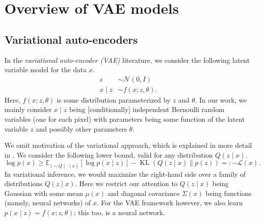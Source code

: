 \documentclass[10pt]{article}
\newcommand{\op}[1]{\operatorname{#1}}
\newcommand{\E}{\mathbb{E}}
\begin{document}




\section{Overview of VAE models}

\subsection{Variational auto-encoders}

In the \emph{variational auto-encoder (VAE)}  literature, we consider the following latent variable model for the data $x$.
\begin{align}
z &\sim \mathcal{N}(0,I)\\
x \mid z &\sim f(x ; z, \theta).
\end{align}
Here, $f(x;z,\theta)$ is some distribution parameterized by $z$ and $\theta$. In our work, we mainly consider $x \mid z$ being [conditionally] independent Bernoulli random variables (one for each pixel) with parameters being some function of the latent variable $z$ and possibly other parameters $\theta$.

We omit motivation of the variational approach, which is explained in more detail in \cite{doersch2016tutorial}.
We consider the following lower bound, valid for any distribution $Q(z \mid x)$.
\begin{equation}
\log p(x)
\ge \E_{z \sim Q(\cdot \mid x)}[\log p(x \mid z)]
- \op{KL}(Q(z \mid x) \| p(z)) =: -\mathcal{L}(x).
\label{equation:vae_loss}
\end{equation}
In variational inference, we would maximize the right-hand side over a family of distributions $Q(z \mid x)$. Here we restrict our attention to $Q(z \mid x)$ being Gaussian with some mean $\mu(x)$ and diagonal covariance $\Sigma(x)$ being functions (namely, neural networks) of $x$.
For the VAE framework however, we also learn $p(x \mid z) = f(x;z,\theta)$; this too, is a neural network.
\end{document}
